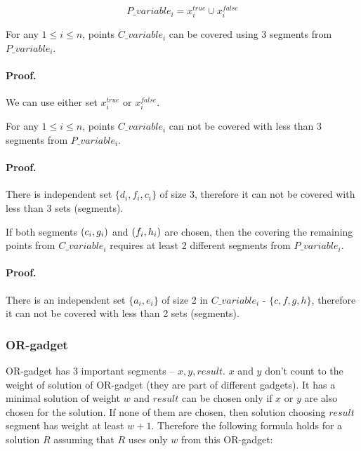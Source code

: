 $$P\_variable_i = x^{true}_i \cup x^{false}_i$$


\begin{lemma}
\label{choose_variables_solution}
For any $1 \le i \le n$, points $C\_variable_i$
can be covered using 3 segments from $P\_variable_i$.
\end{lemma}

\paragraph{Proof.}
We can use either set $x^{true}_i$ or $x^{false}_i$.


\begin{lemma}
\label{choose_variables_no_less}
For any $1 \le i \le n$, points $C\_variable_i$
can not be covered with less than 3 segments from $P\_variable_i$.
\end{lemma}

\paragraph{Proof.}
There is independent set $\{d_i, f_i, c_i\}$ of size 3, therefore it can
not be covered with less than 3 sets (segments).


\begin{lemma}
\label{choose_variables_both}
If both segments $(c_i, g_i)$ and $(f_i, h_i)$ are chosen, then
the covering the remaining points from $C\_variable_i$
requires at least 2 different
segments from $P\_variable_i$.
\end{lemma}
\paragraph{Proof.}
There is an independent set $\{a_i, e_i\}$ of size 2
in $C\_variable_i$ - $\{c, f, g, h\}$,
therefore it can not be covered with less than 2 sets (segments).


\subsubsection{OR-gadget}

OR-gadget has 3 important segments
-- $x, y, result$. $x$ and $y$ don't count to the weight of solution
of OR-gadget (they are part of different gadgets).
It has a minimal solution of weight $w$
and $result$ can be chosen only if $x$ or $y$ are also chosen
for the solution.
If none of them are chosen, then solution
choosing $result$ segment has weight at least $w+1$.
Therefore the following formula holds for a solution $R$
assuming that $R$ uses only $w$ from this OR-gadget:

